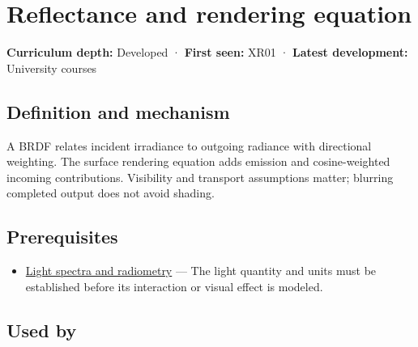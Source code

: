 \hypertarget{appendix-96da0b153b77}{}\label{referencestart:appendix-96da0b153b77}
\section{Reflectance and rendering equation}\label{appendix-96da0b153b77-reflectance-and-rendering-equation}

\hypertarget{appendix-96da0b153b77-reflectance-and-rendering-equation}{}

\textbf{Curriculum depth:} Developed · \textbf{First seen:} XR01 · \textbf{Latest development:} University courses

\begin{allmightroledefinition}

\subsection{Definition and mechanism}\label{appendix-96da0b153b77-definition-and-mechanism}

\hypertarget{appendix-96da0b153b77-definition-and-mechanism}{}

A BRDF relates incident irradiance to outgoing radiance with directional weighting. The surface rendering equation adds emission and cosine-weighted incoming contributions. Visibility and transport assumptions matter; blurring completed output does not avoid shading.

\end{allmightroledefinition}

\subsection{Prerequisites}\label{appendix-96da0b153b77-prerequisites}

\hypertarget{appendix-96da0b153b77-prerequisites}{}

\begin{itemize}
\tightlist
\item
  \hyperref[appendix-215c2570199b]{Light spectra and radiometry} --- The light quantity and units must be established before its interaction or visual effect is modeled.
\end{itemize}

\subsection{Used by}\label{appendix-96da0b153b77-used-by}

\hypertarget{appendix-96da0b153b77-used-by}{}

